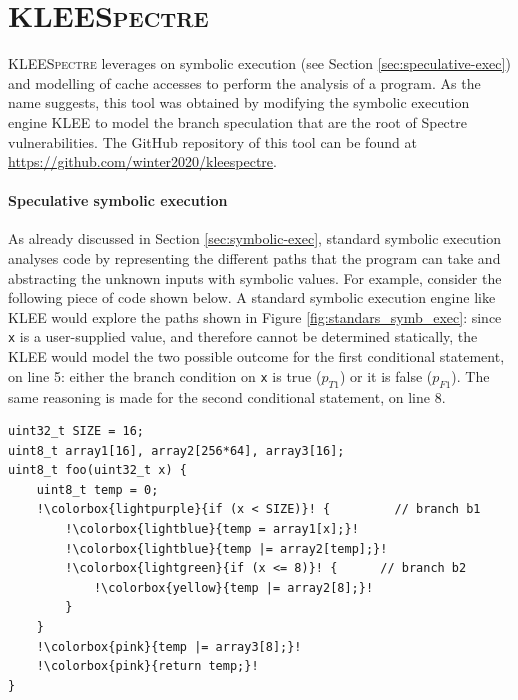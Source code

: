 \documentclass[12pt,a4paper]{book}
\theoremstyle{definition}
\begin{document}
	\section{\textsc{KLEESpectre}}\label{sec:kleespectre}
	\textsc{KLEESpectre} \cite{Wang2019} leverages on symbolic execution (see Section \ref{sec:speculative-exec}) and modelling of cache accesses to perform the analysis of a program. As the name suggests, this tool was obtained by modifying the symbolic execution engine KLEE \cite{Cadar2008} to model the branch speculation that are the root of Spectre vulnerabilities. The GitHub repository of this tool can be found at \url{https://github.com/winter2020/kleespectre}.
	\paragraph{Speculative symbolic execution} As already discussed in Section \ref{sec:symbolic-exec}, standard symbolic execution analyses code by representing the different paths that the program can take and abstracting the unknown inputs with symbolic values. For example, consider the following piece of code shown below. A standard symbolic execution engine like KLEE would explore the paths shown in Figure \ref{fig:standars_symb_exec}: since \texttt{x} is a user-supplied value, and therefore cannot be determined statically, the KLEE would model the two possible outcome for the first conditional statement, on line 5: either the branch condition on \texttt{x} is true ($p_{T1}$) or it is false ($p_{F1}$). The same reasoning is made for the second conditional statement, on line 8.
	\begin{lstlisting}[escapechar=!]
uint32_t SIZE = 16; 
uint8_t array1[16], array2[256*64], array3[16];
uint8_t foo(uint32_t x) { 
	uint8_t temp = 0; 
	!\colorbox{lightpurple}{if (x < SIZE)}! {		  // branch b1
		!\colorbox{lightblue}{temp = array1[x];}!
		!\colorbox{lightblue}{temp |= array2[temp];}!
		!\colorbox{lightgreen}{if (x <= 8)}! {		// branch b2
			!\colorbox{yellow}{temp |= array2[8];}!
		}	
	}
	!\colorbox{pink}{temp |= array3[8];}!
	!\colorbox{pink}{return temp;}!
}
	\end{lstlisting}
\end{document}
